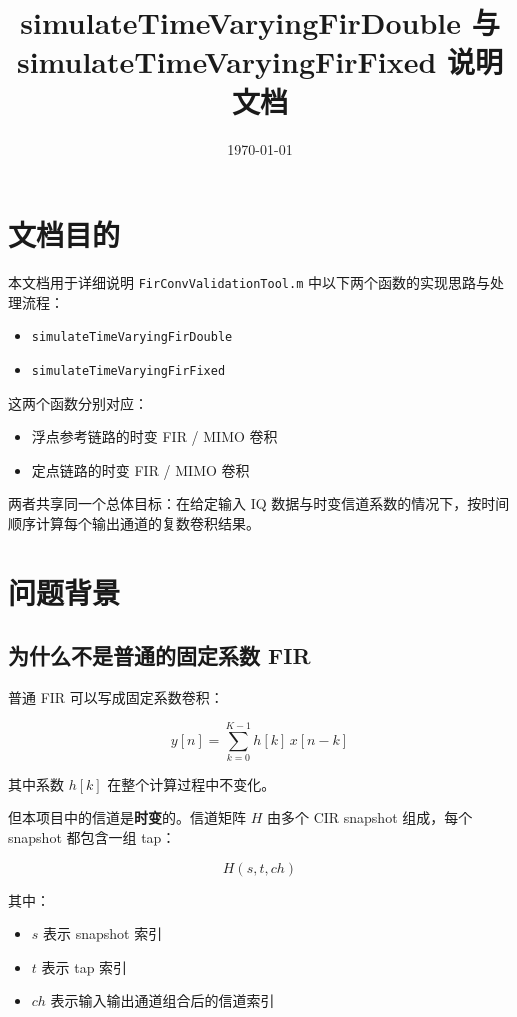 \documentclass[12pt,a4paper]{article}
\title{simulateTimeVaryingFirDouble 与 simulateTimeVaryingFirFixed 说明文档}
\author{}
\date{\today}
\begin{document}
\maketitle

\section{文档目的}

本文档用于详细说明 \texttt{FirConvValidationTool.m} 中以下两个函数的实现思路与处理流程：

\begin{itemize}
\item \texttt{simulateTimeVaryingFirDouble}
\item \texttt{simulateTimeVaryingFirFixed}
\end{itemize}

这两个函数分别对应：

\begin{itemize}
\item 浮点参考链路的时变 FIR / MIMO 卷积
\item 定点链路的时变 FIR / MIMO 卷积
\end{itemize}

两者共享同一个总体目标：在给定输入 IQ 数据与时变信道系数的情况下，按时间顺序计算每个输出通道的复数卷积结果。

\section{问题背景}

\subsection{为什么不是普通的固定系数 FIR}

普通 FIR 可以写成固定系数卷积：

\begin{equation}
y[n] = \sum_{k=0}^{K-1} h[k]\,x[n-k]
\end{equation}

其中系数 $h[k]$ 在整个计算过程中不变化。

但本项目中的信道是\textbf{时变}的。信道矩阵 $H$ 由多个 CIR snapshot 组成，每个 snapshot 都包含一组 tap：

\begin{equation}
H(s, t, ch)
\end{equation}

其中：

\begin{itemize}
\item $s$ 表示 snapshot 索引
\item $t$ 表示 tap 索引
\item $ch$ 表示输入输出通道组合后的信道索引
\end{itemize}
\end{document}
